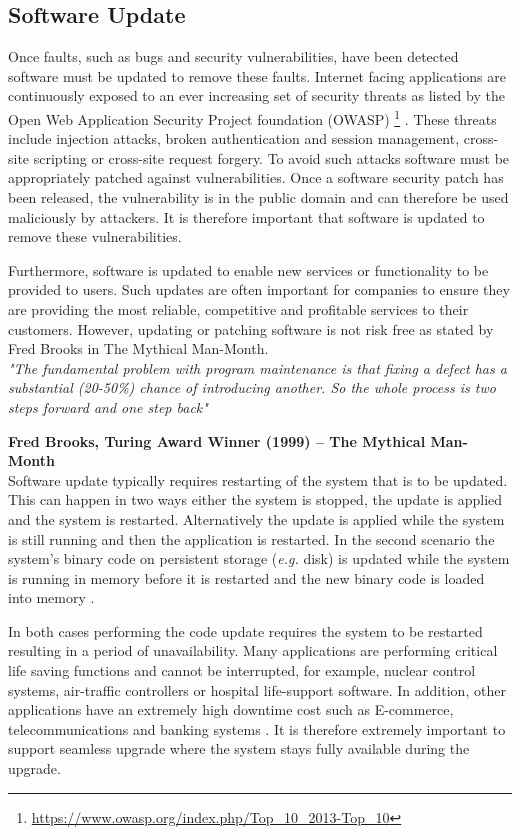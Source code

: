 \documentclass[a4paper,11pt,twoside]{article}
\begin{document}
\subsection{Software Update} 

Once faults, such as bugs and security vulnerabilities, have been detected software must be updated to remove these faults. Internet facing applications are continuously exposed to an ever increasing set of security threats as listed by the Open Web Application Security Project foundation (OWASP) \footnote{\url{https://www.owasp.org/index.php/Top_10_2013-Top_10}} . These threats include injection attacks, broken authentication and session management, cross-site scripting or cross-site request forgery. To avoid such attacks software must be appropriately patched against vulnerabilities. Once a software security patch has been released, the vulnerability is in the public domain and can therefore be used maliciously by attackers. It is therefore important that software is updated to remove these vulnerabilities.

Furthermore, software is updated to enable new services or functionality to be provided to users. Such updates are often important for companies to ensure they are providing the most reliable, competitive and profitable services to their customers. However, updating or patching software is not risk free as stated by Fred Brooks in The Mythical Man-Month. \\

\noindent\textit{ "The fundamental problem with program maintenance is that fixing a defect has a substantial (20-50\%) chance of introducing another. So the whole process is two steps forward and one step back"}  

\hfill \textbf{Fred Brooks, Turing Award Winner (1999) – The Mythical Man-Month} \\

Software update typically requires restarting of the system that is to be updated. This can happen in two ways either the system is stopped, the update is applied and the system is restarted. Alternatively the update is applied while the system is still running and then the application is restarted. In the second scenario the system's binary code on persistent storage (\textit{e.g.} disk) is updated while the system is running in memory before it is restarted and the new binary code is loaded into memory \cite{Java}. 

In both cases performing the code update requires the system to be restarted resulting in a period of unavailability. Many applications are performing critical life saving functions and cannot be interrupted, for example, nuclear control systems, air-traffic controllers or hospital life-support software. In addition, other applications have an extremely high downtime cost such as E-commerce, telecommunications and banking systems \cite{fly}. It is therefore extremely important to support seamless upgrade where the system stays fully available during the upgrade. 
\end{document}
